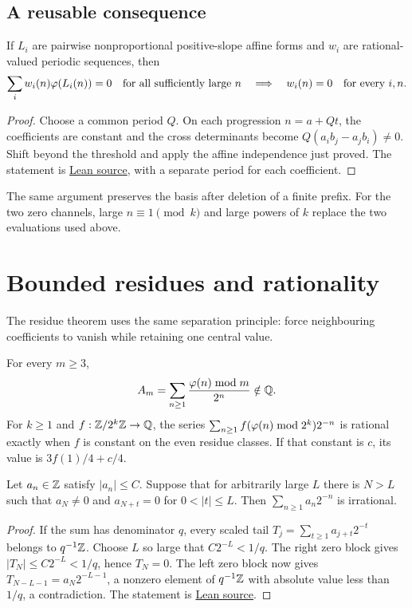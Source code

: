 \documentclass[11pt]{article}
\begin{document}
\subsection{A reusable consequence}
\begin{corollary}\label{cor:periodic-freezing}
If $L_i$ are pairwise nonproportional positive-slope affine forms and $w_i$
are rational-valued periodic sequences, then
\[
 \sum_i w_i(n)\varphi(L_i(n))=0\quad\text{for all sufficiently large }n
 \quad\Longrightarrow\quad w_i(n)=0\quad\text{for every }i,n.
\]
\end{corollary}
\begin{proof}
Choose a common period $Q$. On each progression $n=a+Qt$, the coefficients
are constant and the cross determinants become $Q(a_ib_j-a_jb_i)\ne0$.
Shift beyond the threshold and apply the affine independence just proved.
The statement is \href{https://github.com/wcook04/plectis-erdos/blob/f36a98bf3d3e6f65f1074e3b800e3293d5b8a51a/ErdosProblems/Erdos249/PaperCompleteR7/PeriodicAndPulse.lean#L64}{Lean source},
with a separate period for each coefficient.
\end{proof}
The same argument preserves the basis after deletion of a finite prefix.
For the two zero channels, large $n\equiv1\pmod k$ and large powers of $k$
replace the two evaluations used above.
\section{Bounded residues and rationality}\label{sec:family}
The residue theorem uses the same separation principle: force neighbouring
coefficients to vanish while retaining one central value.

\begin{theorem}\label{res:residueseries}
For every $m\ge3$,
\[
 A_m=\sum_{n\ge1}\frac{\varphi(n)\bmod m}{2^n}\notin\mathbb{Q}.
\]
For $k\ge1$ and $f:\mathbb{Z}/2^k\mathbb{Z}\to\mathbb{Q}$, the series
$\sum_{n\ge1}f(\varphi(n)\bmod2^k)2^{-n}$ is rational exactly when $f$ is
constant on the even residue classes. If that constant is $c$, its value is
$3f(1)/4+c/4$.
\end{theorem}

\begin{lemma}\label{lem:bounded-pulse}
Let $a_n\in\mathbb{Z}$ satisfy $|a_n|\le C$. Suppose that for arbitrarily large $L$
there is $N>L$ such that $a_N\ne0$ and
$a_{N+t}=0$ for $0<|t|\le L$. Then $\sum_{n\ge1}a_n2^{-n}$ is irrational.
\end{lemma}
\begin{proof}
If the sum has denominator $q$, every scaled tail
$T_j=\sum_{t\ge1}a_{j+t}2^{-t}$ belongs to $q^{-1}\mathbb{Z}$.
Choose $L$ so large that $C2^{-L}<1/q$.
The right zero block gives $|T_N|\le C2^{-L}<1/q$, hence $T_N=0$.
The left zero block now gives
$T_{N-L-1}=a_N2^{-L-1}$, a nonzero element of $q^{-1}\mathbb{Z}$ with absolute
value less than $1/q$, a contradiction. The statement is
\href{https://github.com/wcook04/plectis-erdos/blob/f36a98bf3d3e6f65f1074e3b800e3293d5b8a51a/ErdosProblems/Erdos249/PaperCompleteR7/PeriodicAndPulse.lean#L106}{Lean source}.
\end{proof}
\end{document}
